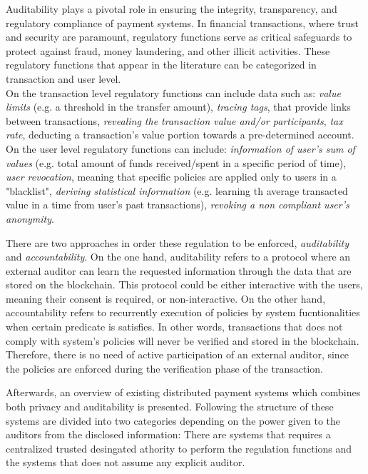 
Auditability plays a pivotal role in ensuring the integrity, transparency, and regulatory compliance of payment systems. 
In financial transactions, where trust and security are paramount, regulatory functions serve as critical safeguards to protect against fraud, money laundering, and other illicit activities.
These regulatory functions that appear in the literature can be categorized in transaction and user level.\\
On the transaction level regulatory functions can include data such as: 
\emph{value limits} (e.g. a threshold in the transfer amount), 
\emph{tracing tags}, that provide links between transactions,
\emph{revealing the transaction value and/or participants},
\emph{tax rate}, deducting a transaction's value portion towards a pre-determined account.\\
On the user level regulatory functions can include:
\emph{information of user's sum of values} (e.g. total amount of funds received/spent in a specific period of time),
\emph{user revocation}, meaning that specific policies are applied only to users in a "blacklist",
\emph{deriving statistical information} (e.g. learning th average transacted value in a time from user's past transactions),
\emph{revoking a non compliant user's anonymity}.

There are two approaches in order these regulation to be enforced, \emph{auditability} and \emph{accountability}.
On the one hand, auditability refers to a protocol where an external auditor can learn the requested information through the data that are stored on the blockchain.
This protocol could be either interactive with the users, meaning their consent is required, or non-interactive.
On the other hand, accountability refers to recurrently execution of policies by system fucntionalities when certain predicate is satisfies.
In other words, transactions that does not comply with system's policies will never be verified and stored in the blockchain.
Therefore, there is no need of active participation of an external auditor, since the policies are enforced during the verification phase of the transaction. 

Afterwards, an overview of existing distributed payment systems which combines both privacy and auditability is presented.
Following the structure of \cite{SokAuditability} these systems are divided into two categories depending on the power given to the auditors from the disclosed information:
There are systems that requires a centralized trusted desingated athority to perform the regulation functions and the systems that does not assume any explicit auditor.
